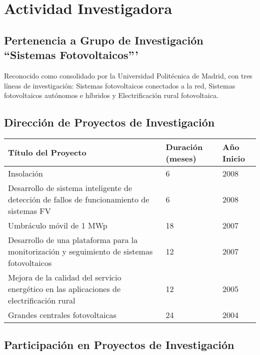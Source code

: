 \documentclass[article, a4paper]{memoir}
\begin{document}
\section{Actividad Investigadora}
\label{sec-4}

\subsection{Pertenencia a Grupo de Investigación ``Sistemas Fotovoltaicos'''}
\label{sec-4-1}

Reconocido como consolidado por la Universidad Politécnica de
Madrid, con tres líneas de investigación: Sistemas fotovoltaicos
conectados a la red, Sistemas fotovoltaicos autónomos e híbridos y
Electrificación rural fotovoltaica.


\subsection{Dirección de Proyectos de Investigación}
\label{sec-4-2}
\begin{center}
\begin{tabular}{p{110mm}|p{17mm}|p{25mm}}
Título del Proyecto & Duración (meses) & Año Inicio\\
\hline
Insolación & 6 & 2008\\
Desarrollo de sistema inteligente de detección de fallos de funcionamiento de sistemas FV & 6 & 2008\\
Umbráculo móvil de 1 MWp & 18 & 2007\\
Desarrollo de una plataforma para la monitorización y seguimiento de sistemas fotovoltaicos & 12 & 2007\\
Mejora de la calidad del servicio energético en las aplicaciones de electrificación rural & 12 & 2005\\
Grandes centrales fotovoltaicas & 24 & 2004\\
\end{tabular}
\end{center}


\subsection{Participación en Proyectos de Investigación}
\label{sec-4-3}
\end{document}
